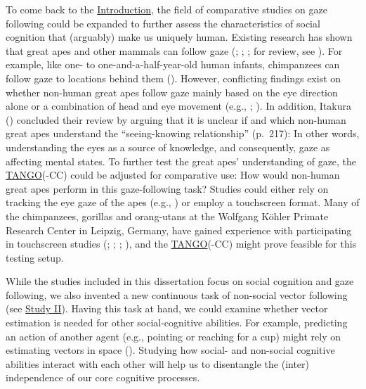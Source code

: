 \documentclass[
]{scrbook}
\begin{document}
To come back to the \hyperref[introduction]{Introduction}, the field of comparative studies on gaze following could be expanded to further assess the characteristics of social cognition that (arguably) make us uniquely human. Existing research has shown that great apes and other mammals can follow gaze (; ; ; for review, see ). For example, like one- to one-and-a-half-year-old human infants, chimpanzees can follow gaze to locations behind them (). However, conflicting findings exist on whether non-human great apes follow gaze mainly based on the eye direction alone or a combination of head and eye movement (e.g., ; ). In addition, Itakura () concluded their review by arguing that it is unclear if and which non-human great apes understand the ``seeing-knowing relationship'' (p.~217): In other words, understanding the eyes as a source of knowledge, and consequently, gaze as affecting mental states. To further test the great apes' understanding of gaze, the \hyperref[acronyms_TANGO]{TANGO}(-CC) could be adjusted for comparative use: How would non-human great apes perform in this gaze-following task? Studies could either rely on tracking the eye gaze of the apes (e.g., ) or employ a touchscreen format. Many of the chimpanzees, gorillas and orang-utans at the Wolfgang Köhler Primate Research Center in Leipzig, Germany, have gained experience with participating in touchscreen studies (; ; ; ), and the \hyperref[acronyms_TANGO]{TANGO}(-CC) might prove feasible for this testing setup.

While the studies included in this dissertation focus on social cognition and gaze following, we also invented a new continuous task of non-social vector following (see \hyperref[studyII]{Study II}). Having this task at hand, we could examine whether vector estimation is needed for other social-cognitive abilities. For example, predicting an action of another agent (e.g., pointing or reaching for a cup) might rely on estimating vectors in space (). Studying how social- and non-social cognitive abilities interact with each other will help us to disentangle the (inter) independence of our core cognitive processes.
\end{document}
